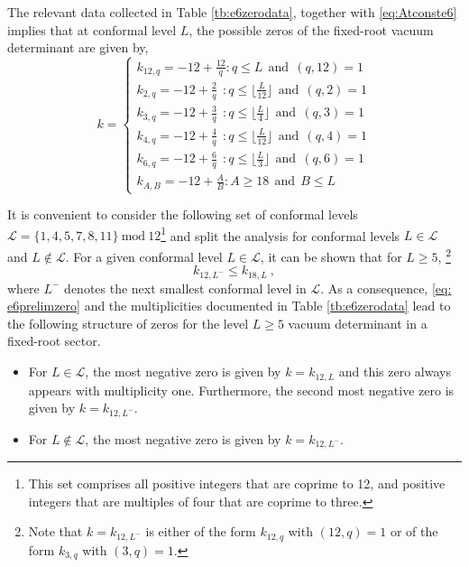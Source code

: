 The relevant data collected in Table \ref{tb:e6zerodata}, together with \eqref{eq:Atconste6} implies that at conformal level $L$, the possible zeros of the fixed-root vacuum determinant are given by,
\begin{equation} \label{eq: e6prelimzero}
    k = \begin{cases}
        k_{12,q} = -12 + \frac{12}{q}: q \leqslant L \ \ \text{and} \ \ (q,12)=1 \\ 
        k_{2,q} = -12 + \frac{2}{q} \ \ : q \leqslant \lfloor \frac{L}{12} \rfloor \ \ \text{and} \ \ (q,2)=1 \\
        k_{3,q} = -12 + \frac{3}{q} \ \ : q \leqslant \lfloor \frac{L}{4} \rfloor \ \ \text{and} \ \ (q,3)=1 \\
        k_{4,q} = -12 + \frac{4}{q} \ \ : q \leqslant \lfloor \frac{L}{12} \rfloor \ \ \text{and} \ \ (q,4)=1 \\
        k_{6,q} = -12 + \frac{6}{q} \ \ : q \leqslant \lfloor \frac{L}{3} \rfloor \ \ \text{and} \ \ (q,6)=1 \\
        k_{A,B} = -12 + \frac{A}{B}: A \geqslant 18 \ \ \text{and} \ \ B \leqslant L
    \end{cases}
\end{equation}


It is convenient to consider the following set of conformal levels $\mathcal{L} = \{1,4,5,7,8,11\}~\text{mod}~12$\footnote{This set comprises all positive integers that are coprime to 12, and positive integers that are multiples of four that are coprime to three.} and split the analysis for conformal levels $L \in \mathcal{L}$ and $L \notin \mathcal{L}$. For a given conformal level $L \in \mathcal{L}$, it can be shown that for $L \geqslant 5$, \footnote{Note that $k = k_{12,L^-}$ is either of the form $k_{12,q}$ with $(12,q) = 1$ or of the form $k_{3,q}$ with $(3,q) = 1$.}
\begin{equation}
    k_{12,L^-} \leqslant k_{18,L}~,
\end{equation}
where $L^-$ denotes the next smallest conformal level in $\mathcal{L}$. As a consequence, \eqref{eq: e6prelimzero} and the multiplicities documented in Table \ref{tb:e6zerodata} lead to the following structure of zeros for the level $L \geqslant 5$ vacuum determinant in a fixed-root sector.
\begin{itemize}
    \item For $L \in \mathcal{L}$, the most negative zero is given by $k = k_{12,L}$ and this zero always appears with multiplicity one. Furthermore, the second most negative zero is given by $k = k_{12,L^-}$. 
    \item For $L \notin \mathcal{L}$, the most negative zero is given by $k = k_{12, L^-}$.
\end{itemize}

